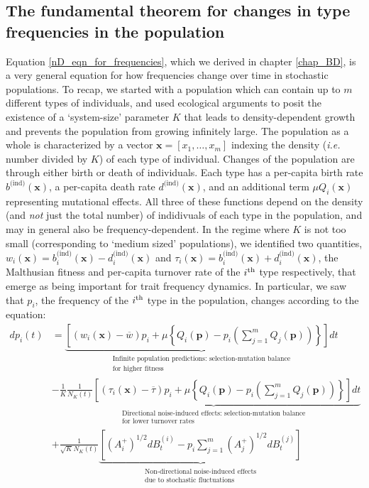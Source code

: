 \subsection{The fundamental theorem for changes in type frequencies in the population}\label{sec_fun_theorem_freq}
Equation \eqref{nD_eqn_for_frequencies}, which we derived in chapter \ref{chap_BD}, is a very general equation for how frequencies change over time in stochastic populations. To recap, we started with a population which can contain up to $m$ different types of individuals, and used ecological arguments to posit the existence of a `system-size' parameter $K$ that leads to density-dependent growth and prevents the population from growing infinitely large. The population as a whole is characterized by a vector $\mathbf{x} = [x_1, \ldots, x_m]$ indexing the density (\emph{i.e.} number divided by $K$) of each type of individual. Changes of the population are through either birth or death of individuals. Each type has a per-capita birth rate $b^{\textrm{(ind)}}(\mathbf{x})$, a per-capita death rate $d^{\textrm{(ind)}}(\mathbf{x})$, and an additional term $\mu Q_{i}(\mathbf{x})$ representing mutational effects. All three of these functions depend on the density (and \emph{not} just the total number) of indidivuals of each type in the population, and may in general also be frequency-dependent. In the regime where $K$ is not too small (corresponding to `medium sized' populations), we identified two quantities, $w_i(\mathbf{x}) = b^{\textrm{(ind)}}_{i}(\mathbf{x}) - d^{\textrm{(ind)}}_{i}(\mathbf{x})$ and $\tau_i(\mathbf{x}) = b^{\textrm{(ind)}}_{i}(\mathbf{x}) + d^{\textrm{(ind)}}_{i}(\mathbf{x})$, the Malthusian fitness and per-capita turnover rate of the $i\textsuperscript{th}$ type respectively, that emerge as being important for trait frequency dynamics. In particular, we saw that $p_i$, the frequency of the $i\textsuperscript{th}$ type in the population, changes according to the equation:
\begin{equation}
\label{nD_stochastic_RM}
\begin{aligned}
dp_i(t) &= \underbrace{\left[(w_i(\mathbf{x}) - \overline{w})p_i + \mu\left\{Q_i(\mathbf{p}) - p_i\left(\sum\limits_{j=1}^{m}Q_j(\mathbf{p})\right)\right\}\right]dt}_{\substack{\text{Infinite population predictions: selection-mutation balance} \\ \text{for higher fitness}}}\\
&- \frac{1}{K}\underbrace{\frac{1}{N_{K}(t)}\left[(\tau_i(\mathbf{x}) - \overline{\tau})p_i + \mu\left\{Q_i(\mathbf{p}) - p_i\left(\sum\limits_{j=1}^{m}Q_j(\mathbf{p})\right)\right\}\right]dt}_{\substack{\text{Directional noise-induced effects: selection-mutation balance}\\\text{for lower turnover rates}}}\\
&+ \frac{1}{\sqrt{K}N_{K}(t)}\underbrace{\left[\left(A^{+}_{i}\right)^{1/2}dB^{(i)}_t - p_i\sum\limits_{j=1}^{m}\left(A^{+}_{j}\right)^{1/2}dB^{(j)}_t\right]}_{\substack{\text{Non-directional noise-induced effects}\\\text{due to stochastic fluctuations}}}
\end{aligned}
\end{equation}
